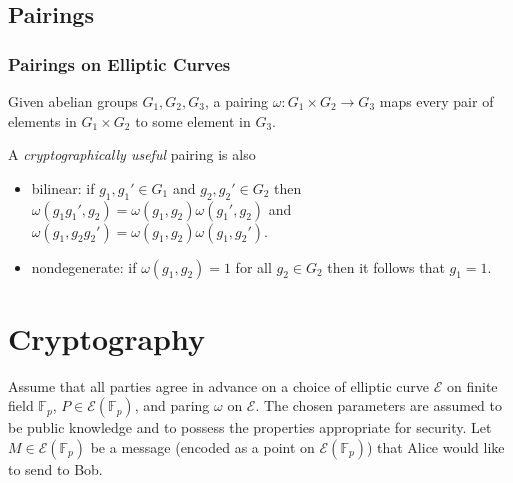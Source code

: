 \documentclass{beamer}
\begin{document}
    \subsection{Pairings}
    \begin{frame}
        \frametitle{Pairings on Elliptic Curves}
        \begin{definition}
            Given abelian groups \(G_1, G_2, G_3\), a pairing
            \(\omega: G_1 \times G_2 \to G_3\) maps every pair of elements
            in \(G_1 \times G_2\) to some element in \(G_3\).
        \end{definition}
        \vfill
        A \emph{cryptographically useful} pairing is also
        \begin{itemize}
            \item bilinear: if \(g_1, g_1' \in G_1\)
                and \(g_2, g_2' \in G_2\)
                then \(\omega(g_1g_1', g_2) =
                \omega(g_1, g_2)\omega(g_1', g_2)\)
                and \(\omega(g_1, g_2g_2') =
                \omega(g_1, g_2)\omega(g_1, g_2')\).
            \item nondegenerate: if \(\omega(g_1, g_2) = 1\)
                for all \(g_2 \in G_2\) then it follows that \(g_1 = 1\).
        \end{itemize}
    \end{frame}

    \section{Cryptography}
    \begin{frame}
        Assume that all parties agree in advance on a choice of elliptic curve
        \(\mathcal{E}\) on finite field \(\mathbb{F}_p\),
        \(P \in \mathcal{E}(\mathbb{F}_p)\), and paring \(\omega\)
        on \(\mathcal{E}\).
        \vfill
        The chosen parameters are assumed to be public knowledge and to
        possess the properties appropriate for security.
        \vfill
        Let \(M \in \mathcal{E}(\mathbb{F}_p)\) be a message (encoded as
        a point on \(\mathcal{E}(\mathbb{F}_p)\))
        that Alice would like to send to Bob.
    \end{frame}
\end{document}
